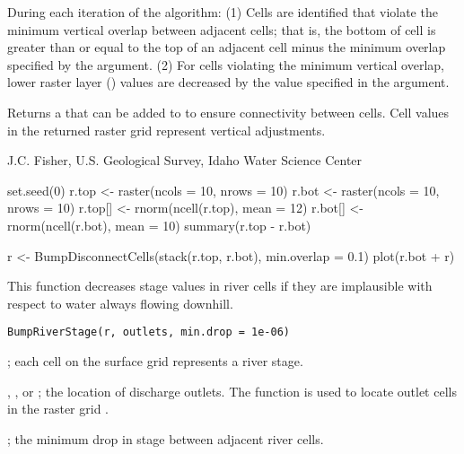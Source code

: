 \documentclass[letterpaper]{book}
\begin{document}
%
\begin{Details}\relax
During each iteration of the algorithm:
(1) Cells are identified that violate the minimum vertical overlap between adjacent cells; that is, the bottom of cell  is greater than or equal to the top of an adjacent cell  minus the minimum overlap specified by the  argument.
(2) For cells violating the minimum vertical overlap, lower raster layer () values are decreased by the value specified in the  argument.
\end{Details}
%
\begin{Value}
Returns a  that can be added to  to ensure connectivity between cells.
Cell values in the returned raster grid represent vertical adjustments.
\end{Value}
%
\begin{Author}\relax
J.C. Fisher, U.S. Geological Survey, Idaho Water Science Center
\end{Author}
%
\begin{Examples}
\begin{ExampleCode}
set.seed(0)
r.top <- raster(ncols = 10, nrows = 10)
r.bot <- raster(ncols = 10, nrows = 10)
r.top[] <- rnorm(ncell(r.top), mean = 12)
r.bot[] <- rnorm(ncell(r.bot), mean = 10)
summary(r.top - r.bot)

r <- BumpDisconnectCells(stack(r.top, r.bot), min.overlap = 0.1)
plot(r.bot + r)
\end{ExampleCode}
\end{Examples}
%
\begin{Description}\relax
This function decreases stage values in river cells if they are implausible with respect to water always flowing downhill.
\end{Description}
%
\begin{Usage}
\begin{verbatim}
BumpRiverStage(r, outlets, min.drop = 1e-06)
\end{verbatim}
\end{Usage}
%
\begin{Arguments}
\begin{ldescription}
\item[\code{r}] ; each cell on the surface grid represents a river stage.
\item[\code{outlets}] , ,  or ; the location of discharge outlets.
The  function is used to locate outlet cells in the raster grid .
\item[\code{min.drop}] ; the minimum drop in stage between adjacent river cells.
\end{ldescription}
\end{Arguments}
\end{document}
